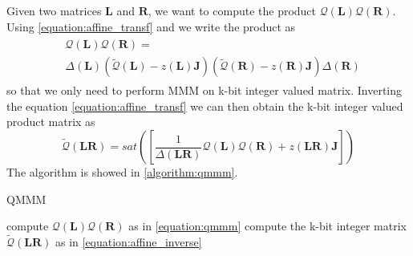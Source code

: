  Given two matrices $\mathbf{L}$ and $\mathbf{R}$, we want to compute the product $\mathcal{Q}(\mathbf{L}) \mathcal{Q}(\mathbf{R})$. Using \cref{equation:affine_transf} and we write the product as 
\begin{align}\label{equation:qmmm}
\begin{split}
& \mathcal{Q}(\mathbf{L}) \mathcal{Q}(\mathbf{R}) =\\
 & \Delta (\mathbf{L})\left( \tilde{\mathcal{Q}}(\mathbf{L}) - z(\mathbf{L})\mathbf{J} \right)
\left( \tilde{\mathcal{Q}}(\mathbf{R}) - z(\mathbf{R})\mathbf{J} \right)  \Delta (\mathbf{R})
\end{split}
\end{align}
so that we only need to perform MMM on k-bit integer valued matrix. Inverting the equation \ref{equation:affine_transf}  we can then obtain the k-bit integer valued product matrix as 
\begin{equation}\label{equation:affine_inverse}
\tilde{\mathcal{Q}}(\mathbf{LR}) = sat([\frac{1}{\Delta(\mathbf{LR})}\mathcal{Q}(\mathbf{L}) \mathcal{Q}(\mathbf{R}) + z(\mathbf{LR}) \mathbf{J}])
\end{equation} The algorithm is showed in \cref{algorithm:qmmm}.

\begin{algorithm}
	\caption{QMMM}\label{algorithm:qmmm}
	\begin{algorithmic}[1]
		\State compute $\mathcal{Q}(\mathbf{L}) \mathcal{Q}(\mathbf{R})$ as in \cref{equation:qmmm}
		\State compute the k-bit integer matrix $\tilde{\mathcal{Q}}(\mathbf{LR})$ as in \cref{equation:affine_inverse}
 	\end{algorithmic}
\end{algorithm}


